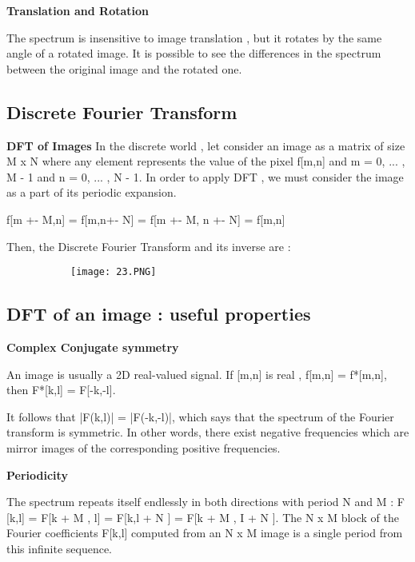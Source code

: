 \documentclass{article}
\begin{document}
\vspace{20mm}

\textbf{Translation and Rotation}
\vspace{2mm}

The spectrum is insensitive to image translation , but it rotates by the same angle of a rotated image. It is possible to see the differences in the spectrum between the original image and the rotated one.

\subsection{Discrete Fourier Transform}
\textbf{DFT of Images}
In the discrete world , let consider an image as a matrix of size M x N where any element represents the value of the pixel f[m,n] and m = 0, ... , M - 1 and n = 0, ... , N - 1. In order to apply DFT , we must consider the image as a part of its periodic expansion.
\begin{center}
    f[m +- M,n] = f[m,n+- N] = f[m +- M, n +- N] = f[m,n]
\end{center}
Then, the Discrete Fourier Transform and its inverse are : 
 \begin{figure}[ht!]
  \centering
  \begin{subfigure}[b]{0.4\linewidth}
    \texttt{[image: 23.PNG]}
  \end{subfigure}
\end{figure}

\vspace{10mm}
\subsection{DFT of an image : useful properties}
\textbf{Complex Conjugate symmetry}
\vspace{2mm}

An image is usually a 2D real-valued signal. If [m,n] is real , f[m,n] = f*[m,n], then F*[k,l] = F[-k,-l].

It follows that |F(k,l)| = |F(-k,-l)|, which says that the spectrum of the Fourier transform is symmetric. In other words, there exist negative frequencies which are mirror images of the corresponding positive frequencies. 

\vspace{2mm}
\textbf{Periodicity}
\vspace{2mm}

The spectrum repeats itself endlessly in both directions with period N and M : F [k,l] = F[k + M , l] = F[k,l + N ] = F[k + M , I + N ]. The N x M block of the Fourier coefficients F[k,l] computed from an N x M image is a single period from this infinite sequence.
\end{document}
